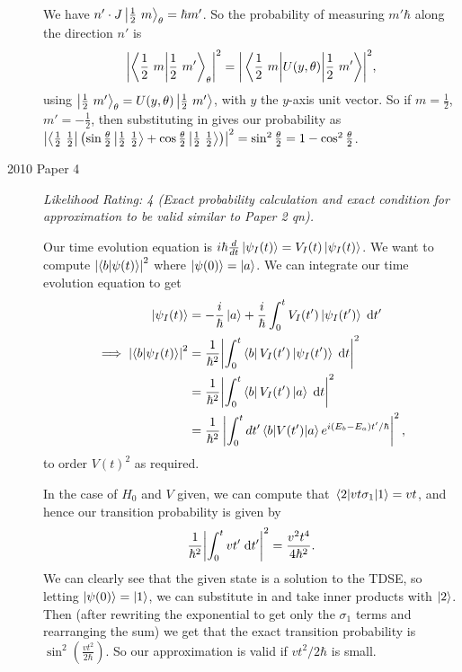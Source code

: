 \documentclass[a4paper]{scrartcl}
\begin{document}
\begin{description}
    We have $n' \cdot J \ket{\frac{1}{2}\ m}_\theta = \hbar m'$. So the probability of measuring $m' \hbar$ along the direction $n'$ is 
    $$
    \abs{\ip{\frac{1}{2}\ m}{\frac{1}{2}\ m'}_\theta}^2 = \abs{\mel{\frac{1}{2}\ m}{U(y, \theta)}{\frac{1}{2}\  m'}}^2,
    $$
    using $\ket{\frac{1}{2}\ m'}_\theta = U(y, \theta) \ket{\frac{1}{2}\ m'}$, with $y$ the $y$-axis unit vector. So if $m = \frac{1}{2}$, $m' = -\frac{1}{2}$, then substituting in gives our probability as $\abs{\bra{\frac{1}{2} \ \frac{1}{2}} \left(\sin \frac{\theta}{2} \ket{\frac{1}{2}\ \frac{1}{2}} + \cos \frac{\theta}{2} \ket{\frac{1}{2} \ \frac{1}{2}}\right)}^2 = \sin^2 \frac{\theta}{2} = 1 - \cos^2 \frac{\theta}{2}$.
        
    \item[2010 Paper 4] \emph{Likelihood Rating: 4 {\color{gray}(Exact probability calculation and exact condition for approximation to be valid similar to Paper 2 qn).}}
    
    Our time evolution equation is
    $
     i \hbar \frac{d}{dt }\ket{\psi_I(t)}= V_I(t) \ket{\psi_I(t)}
    $. We want to compute $\abs{\ip{b}{\psi(t)}}^2$ where $\ket{\psi(0)} = \ket{a}$. We can integrate our time evolution equation to get
    \begin{align*}
    \ket{\psi_I(t)} &= -\frac{i}{\hbar}\ket{a} + \frac{i}{\hbar} \int_0^{t} V_I(t') \ket{\psi_I(t')} \dd t' \\
    \implies \abs{\ip{b}{\psi_I(t)}}^2 &= \frac{1}{\hbar^2} \abs{\int_0^{t} \bra{b} V_I(t') \ket{\psi_I(t')} \dd t}^2 \\
    &= \frac{1}{\hbar^2} \abs{\int_0^{t} \bra{b} V_I(t') \ket{a} \dd t}^2\\
    &= \frac{1}{\hbar^2}\left|\int_0^t d t^{\prime}\mel{b}{V(t')}{a} e^{i\left(E_b-E_a\right) t^{\prime} / \hbar}\right|^2,
    \end{align*}
    to order $V(t)^2$ as required.

    In the case of $H_0$ and $V$ given, we can compute that $\mel{2}{vt \sigma_1}{1} = vt$, and hence our transition probability is given by
    $$
    \frac{1}{\hbar^2}\abs{\int_0^t vt' \;\mathrm{d} t'}^2 = \frac{v^2t^4}{4\hbar^2}.
    $$
    We can clearly see that the given state is a solution to the TDSE, so letting $\ket{\psi(0)} = \ket{1}$, we can substitute in and take inner products with $\ket{2}$. Then (after rewriting the exponential to get only the $\sigma_1$ terms and rearranging the sum) we get that the exact transition probability is $\sin^2(\frac{vt^2}{2\hbar})$. So our approximation is valid if $vt^2/2\hbar$ is small.
    

\end{description}
\end{document}
